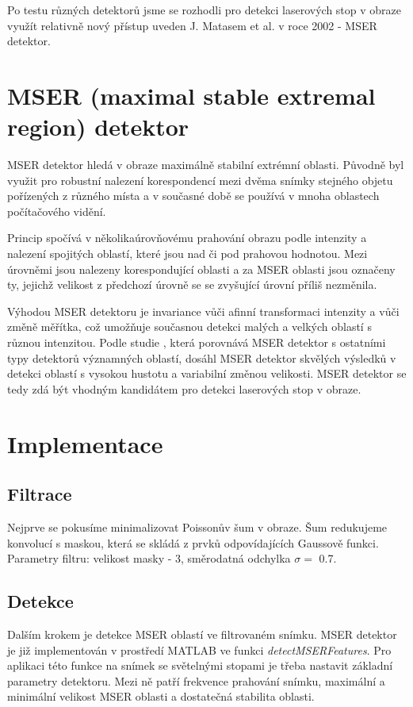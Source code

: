 Po testu různých detektorů jsme se rozhodli pro detekci laserových stop v obraze využít relativně nový přístup uveden J. Matasem et al. \cite{Matas} v roce 2002 - MSER detektor. 




\section{MSER (maximal stable extremal region) detektor}

MSER detektor hledá v obraze maximálně stabilní extrémní oblasti. Původně byl využit pro robustní nalezení korespondencí mezi dvěma snímky stejného objetu pořízených z různého místa a v současné době se používá v mnoha oblastech počítačového vidění.  

Princip spočívá v několikaúrovňovému prahování obrazu podle intenzity a nalezení spojitých oblastí, které jsou nad či pod prahovou hodnotou. Mezi úrovněmi jsou nalezeny korespondující oblasti a za MSER oblasti jsou označeny ty, jejichž velikost z předchozí úrovně se se zvyšující úrovní příliš nezměnila. 

Výhodou MSER detektoru je invariance vůči afinní transformaci intenzity a vůči změně měřítka, což umožňuje současnou detekci malých a velkých oblastí s různou intenzitou. Podle studie \cite{Comparison}, která porovnává MSER detektor s ostatními typy detektorů významných oblastí, dosáhl MSER detektor skvělých výsledků v detekci oblastí s vysokou hustotu a variabilní změnou velikosti. MSER detektor se tedy zdá být vhodným kandidátem pro detekci laserových stop v obraze.

\section{Implementace}

\subsection{Filtrace}
   Nejprve se pokusíme minimalizovat Poissonův šum v obraze. Šum redukujeme konvolucí s maskou, která se skládá z prvků odpovídajících Gaussově funkci. Parametry filtru: velikost masky - \SI{3}{\px}, směrodatná odchylka $\sigma = $ \SI{0.7}{\px}.

\subsection{Detekce} 
   Dalším krokem je detekce MSER oblastí ve filtrovaném snímku. MSER detektor je již implementován v prostředí MATLAB ve funkci \textit{detectMSERFeatures}. Pro aplikaci této funkce na snímek se světelnými stopami je třeba nastavit základní parametry detektoru. Mezi ně patří frekvence prahování snímku, maximální a minimální velikost MSER oblasti a dostatečná stabilita oblasti. 
   
